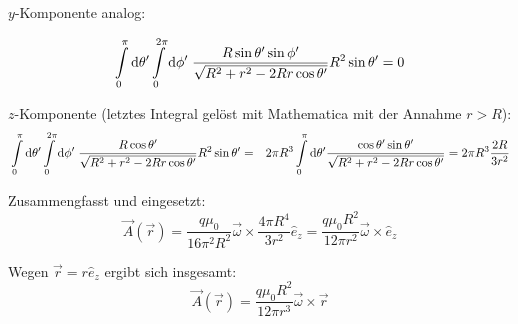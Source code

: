 \documentclass[a4paper,german,12pt,smallheadings]{scrartcl}
\begin{document}
\begin{enumerate}[a)]
  $y$-Komponente analog:

  \begin{align}
    \int\limits_0^\pi \dif \theta'
    \int\limits_0^{2 \pi} \dif \phi' \;
    \frac{R \sin \theta' \sin \phi'}{\sqrt{R^2 + r^2 - 2Rr \cos \theta'}} R^2 \sin \theta' = 0
  \end{align}

  $z$-Komponente (letztes Integral gelöst mit Mathematica mit der Annahme $r >
  R$):
  \begin{align}
    &\int\limits_0^\pi \dif \theta'
    \int\limits_0^{2 \pi} \dif \phi' \;
    \frac{R \cos \theta'}{\sqrt{R^2 + r^2 - 2Rr \cos \theta'}} R^2 \sin \theta'
    =
    &2 \pi R^3
    \int\limits_0^\pi \dif \theta'
    \frac{\cos \theta' \sin \theta'}{\sqrt{R^2 + r^2 - 2Rr \cos \theta'}}
    = 2 \pi R^3 \frac{2R}{3 r^2}
  \end{align}

  Zusammengfasst und eingesetzt:
  \begin{equation}
    \vec{A}(\vec{r})
    = \frac{q \mu_0}{16 \pi^2 R^2} \vec{\omega} \times \frac{4 \pi R^4}{3 r^2} \hat{e}_z
    = \frac{q \mu_0 R^2}{12 \pi r^2} \vec{\omega} \times \hat{e}_z
  \end{equation}

  Wegen $\vec{r} = r \hat{e}_z$ ergibt sich insgesamt:
  \begin{equation}
    \vec{A}(\vec{r}) = \frac{q \mu_0 R^2}{12 \pi r^3} \vec{\omega} \times \vec{r}
  \end{equation}


\end{enumerate}
\end{document}
